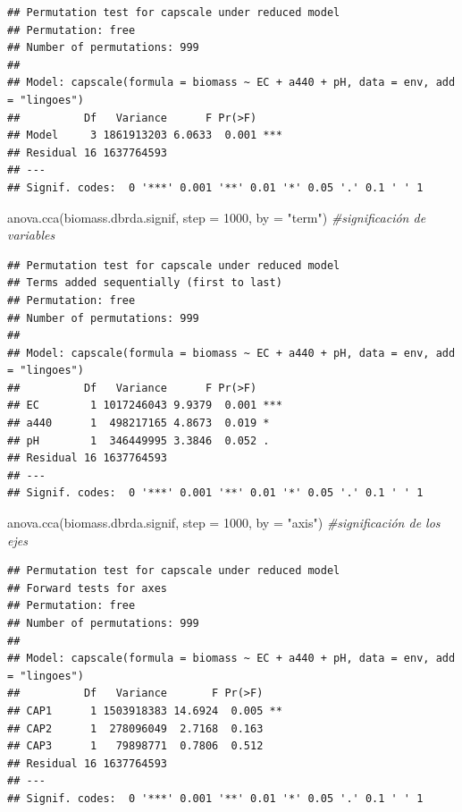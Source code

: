\documentclass[
]{book}
\newenvironment{Shaded}{\begin{snugshade}}{\end{snugshade}}
\newcommand{\AttributeTok}[1]{\textcolor[rgb]{0.77,0.63,0.00}{#1}}
\newcommand{\CommentTok}[1]{\textcolor[rgb]{0.56,0.35,0.01}{\textit{#1}}}
\newcommand{\DecValTok}[1]{\textcolor[rgb]{0.00,0.00,0.81}{#1}}
\newcommand{\FunctionTok}[1]{\textcolor[rgb]{0.00,0.00,0.00}{#1}}
\newcommand{\NormalTok}[1]{#1}
\newcommand{\StringTok}[1]{\textcolor[rgb]{0.31,0.60,0.02}{#1}}
\begin{document}
\begin{verbatim}
## Permutation test for capscale under reduced model
## Permutation: free
## Number of permutations: 999
## 
## Model: capscale(formula = biomass ~ EC + a440 + pH, data = env, add = "lingoes")
##          Df   Variance      F Pr(>F)    
## Model     3 1861913203 6.0633  0.001 ***
## Residual 16 1637764593                  
## ---
## Signif. codes:  0 '***' 0.001 '**' 0.01 '*' 0.05 '.' 0.1 ' ' 1
\end{verbatim}

\begin{Shaded}
\begin{Highlighting}[]
\FunctionTok{anova.cca}\NormalTok{(biomass.dbrda.signif, }\AttributeTok{step =} \DecValTok{1000}\NormalTok{, }\AttributeTok{by =} \StringTok{"term"}\NormalTok{) }\CommentTok{\#significación de variables }
\end{Highlighting}
\end{Shaded}

\begin{verbatim}
## Permutation test for capscale under reduced model
## Terms added sequentially (first to last)
## Permutation: free
## Number of permutations: 999
## 
## Model: capscale(formula = biomass ~ EC + a440 + pH, data = env, add = "lingoes")
##          Df   Variance      F Pr(>F)    
## EC        1 1017246043 9.9379  0.001 ***
## a440      1  498217165 4.8673  0.019 *  
## pH        1  346449995 3.3846  0.052 .  
## Residual 16 1637764593                  
## ---
## Signif. codes:  0 '***' 0.001 '**' 0.01 '*' 0.05 '.' 0.1 ' ' 1
\end{verbatim}

\begin{Shaded}
\begin{Highlighting}[]
\FunctionTok{anova.cca}\NormalTok{(biomass.dbrda.signif, }\AttributeTok{step =} \DecValTok{1000}\NormalTok{, }\AttributeTok{by =} \StringTok{"axis"}\NormalTok{) }\CommentTok{\#significación de los ejes}
\end{Highlighting}
\end{Shaded}

\begin{verbatim}
## Permutation test for capscale under reduced model
## Forward tests for axes
## Permutation: free
## Number of permutations: 999
## 
## Model: capscale(formula = biomass ~ EC + a440 + pH, data = env, add = "lingoes")
##          Df   Variance       F Pr(>F)   
## CAP1      1 1503918383 14.6924  0.005 **
## CAP2      1  278096049  2.7168  0.163   
## CAP3      1   79898771  0.7806  0.512   
## Residual 16 1637764593                  
## ---
## Signif. codes:  0 '***' 0.001 '**' 0.01 '*' 0.05 '.' 0.1 ' ' 1
\end{verbatim}
\end{document}

